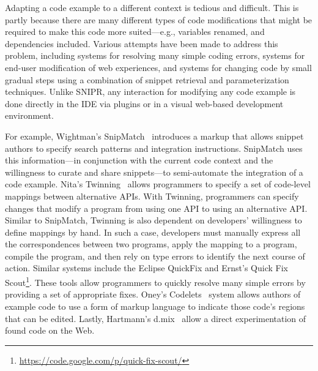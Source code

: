 Adapting a code example to a different context is tedious and difficult. This is partly because there are many different types of code modifications that might be required to make this code more suited---e.g., variables renamed, and dependencies included. Various attempts have been made to address this problem, including systems for resolving many simple coding errors, systems for end-user modification of web experiences, and systems for changing code by small gradual steps using a combination of snippet retrieval and parameterization techniques. Unlike \uppercase{SnipR}, any interaction for modifying any code example is done directly in the IDE via plugins or in a visual web-based development environment.  

For example, Wightman's SnipMatch~\cite{Wightman:2012gc} introduces a markup that allows snippet authors to specify search patterns and integration instructions. SnipMatch uses this information---in conjunction with the current code context and the willingness to curate and share snippets---to semi-automate the integration of a code example. Nita's Twinning~\cite{Nita:2010en} allows programmers to specify a set of code-level mappings between alternative APIs. With Twinning, programmers can specify changes that modify a program from using one API to using an alternative API. Similar to SnipMatch, Twinning is also dependent on developers' willingness to define mappings by hand. In such a case, developers must manually express all the correspondences between two programs, apply the mapping to a program, compile the program, and then rely on type errors to identify the next course of action.  Similar systems include the Eclipse QuickFix and Ernst's Quick Fix Scout\footnote{\url{https://code.google.com/p/quick-fix-scout/}}. These tools allow programmers to quickly resolve many simple errors by providing a set of appropriate fixes. Oney's Codelets~\cite{Oney:2012ge} system allows authors of example code to use a form of markup language to indicate those code's regions that can be edited. Lastly, Hartmann's d.mix~\cite{Hartmann:2007wf} allow a direct experimentation of found code on the Web.

